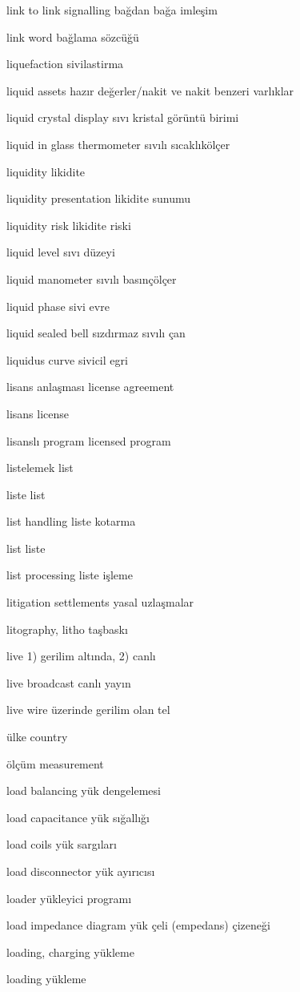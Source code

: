 \documentclass[12pt,fleqn]{article}\usepackage{../../common}
\begin{document}
link to link signalling bağdan bağa imleşim

link word bağlama sözcüğü

liquefaction sivilastirma

liquid assets hazır değerler/nakit ve nakit benzeri varlıklar

liquid crystal display sıvı kristal görüntü birimi

liquid in glass thermometer sıvılı sıcaklıkölçer

liquidity likidite

liquidity presentation likidite sunumu

liquidity risk likidite riski

liquid level sıvı düzeyi

liquid manometer sıvılı basınçölçer

liquid phase sivi evre

liquid sealed bell sızdırmaz sıvılı çan

liquidus curve sivicil egri

lisans anlaşması license agreement

lisans license

lisanslı program licensed program

listelemek list

liste list

list handling liste kotarma

list liste

list processing liste işleme

litigation settlements yasal uzlaşmalar

litography, litho taşbaskı

live 1) gerilim altında, 2) canlı

live broadcast canlı yayın

live wire üzerinde gerilim olan tel

ülke country

ölçüm measurement

load balancing yük dengelemesi

load capacitance yük sığallığı

load coils yük sargıları

load disconnector yük ayırıcısı

loader yükleyici programı

load impedance diagram yük çeli (empedans) çizeneği

loading, charging yükleme

loading yükleme
\end{document}
